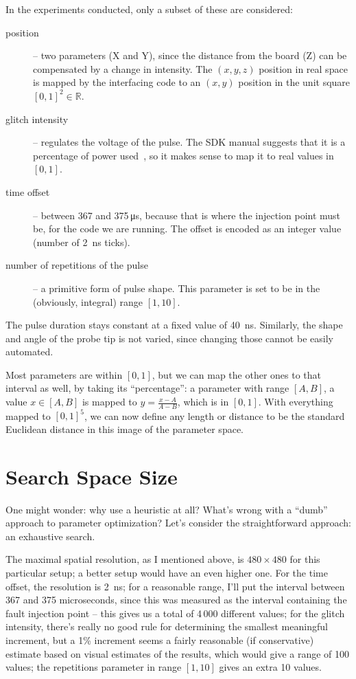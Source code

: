 \documentclass[times, utf8, diplomski]{fer}
\begin{document}
In the experiments conducted, only a subset of these are considered:
\begin{description}
  \item[position] -- two parameters (X and Y), since the distance from the board
        (Z) can be compensated by a change in intensity. The $(x,y,z)$ position
        in real space is mapped by the interfacing code to an $(x,y)$ position
        in the unit square $[0,1]^2 \in \mathbb{R}$.
  \item[glitch intensity] -- regulates the voltage of the pulse. The SDK manual
        suggests that it is a percentage of power used~\cite{RiscureVCGmanual},
        so it makes sense to map it to real values in $[0,1]$.
  \item[time offset] -- between 367 and 375\,\si{\micro\second}, because that is
        where the injection point must be, for the code we are running. The offset
        is encoded as an integer value (number of \SI{2}{\nano\second} ticks).
  \item[number of repetitions of the pulse] -- a primitive form of pulse shape.
        This parameter is set to be in the (obviously, integral) range $[1, 10]$.
\end{description}

The pulse duration stays constant at a fixed value of \SI{40}{\nano\second}.
Similarly, the shape and angle of the probe tip is not varied, since changing
those cannot be easily automated.

Most parameters are within $[0,1]$, but we can map the other ones to that
interval as well, by taking its ``percentage'': a parameter with range $[A,B]$,
a value $x \in [A,B]$ is mapped to $y = \frac{x-A}{A-B}$, which is in $[0,1]$.
With everything mapped to $[0,1]^5$, we can now define any length or distance
to be the standard Euclidean distance in this image of the parameter space.


\section{Search Space Size}\label{sec:search_space}
One might wonder: why use a heuristic at all? What's wrong with a ``dumb''
approach to parameter optimization? Let's consider the straightforward
approach: an exhaustive search.

The maximal spatial resolution, as I mentioned above, is $480 \times 480$ for
this particular setup; a better setup would have an even higher one. For the
time offset, the resolution is \SI{2}{\nano\second}; for a reasonable range,
I'll put the interval between 367 and 375 microseconds, since this was measured
as the interval containing the fault injection point -- this gives us a total of
4\,000 different values; for the glitch intensity, there's really no good rule
for determining the smallest meaningful increment, but a 1\% increment seems
a fairly reasonable (if conservative) estimate based on visual estimates of
the results, which would give a range of 100 values; the repetitions parameter
in range $[1,10]$ gives an extra 10 values.
\end{document}
